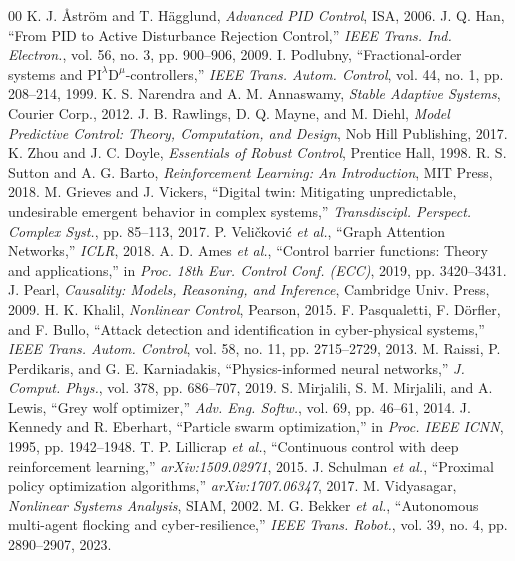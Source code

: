 \documentclass[journal,twocolumn]{IEEEtran}
\begin{document}
\begin{thebibliography}{00}
 K. J. \AA str\"om and T. H\"agglund, \textit{Advanced PID Control}, ISA, 2006.
 J. Q. Han, ``From PID to Active Disturbance Rejection Control,'' \textit{IEEE Trans. Ind. Electron.}, vol. 56, no. 3, pp. 900--906, 2009.
 I. Podlubny, ``Fractional-order systems and $\text{PI}^\lambda \text{D}^\mu$-controllers,'' \textit{IEEE Trans. Autom. Control}, vol. 44, no. 1, pp. 208--214, 1999.
 K. S. Narendra and A. M. Annaswamy, \textit{Stable Adaptive Systems}, Courier Corp., 2012.
 J. B. Rawlings, D. Q. Mayne, and M. Diehl, \textit{Model Predictive Control: Theory, Computation, and Design}, Nob Hill Publishing, 2017.
 K. Zhou and J. C. Doyle, \textit{Essentials of Robust Control}, Prentice Hall, 1998.
 R. S. Sutton and A. G. Barto, \textit{Reinforcement Learning: An Introduction}, MIT Press, 2018.
 M. Grieves and J. Vickers, ``Digital twin: Mitigating unpredictable, undesirable emergent behavior in complex systems,'' \textit{Transdiscipl. Perspect. Complex Syst.}, pp. 85--113, 2017.
 P. Veli\v{c}kovi\'c \textit{et al.}, ``Graph Attention Networks,'' \textit{ICLR}, 2018.
 A. D. Ames \textit{et al.}, ``Control barrier functions: Theory and applications,'' in \textit{Proc. 18th Eur. Control Conf. (ECC)}, 2019, pp. 3420--3431.
 J. Pearl, \textit{Causality: Models, Reasoning, and Inference}, Cambridge Univ. Press, 2009.
 H. K. Khalil, \textit{Nonlinear Control}, Pearson, 2015.
 F. Pasqualetti, F. D\"orfler, and F. Bullo, ``Attack detection and identification in cyber-physical systems,'' \textit{IEEE Trans. Autom. Control}, vol. 58, no. 11, pp. 2715--2729, 2013.
 M. Raissi, P. Perdikaris, and G. E. Karniadakis, ``Physics-informed neural networks,'' \textit{J. Comput. Phys.}, vol. 378, pp. 686--707, 2019.
 S. Mirjalili, S. M. Mirjalili, and A. Lewis, ``Grey wolf optimizer,'' \textit{Adv. Eng. Softw.}, vol. 69, pp. 46--61, 2014.
 J. Kennedy and R. Eberhart, ``Particle swarm optimization,'' in \textit{Proc. IEEE ICNN}, 1995, pp. 1942--1948.
 T. P. Lillicrap \textit{et al.}, ``Continuous control with deep reinforcement learning,'' \textit{arXiv:1509.02971}, 2015.
 J. Schulman \textit{et al.}, ``Proximal policy optimization algorithms,'' \textit{arXiv:1707.06347}, 2017.
 M. Vidyasagar, \textit{Nonlinear Systems Analysis}, SIAM, 2002.
 M. G. Bekker \textit{et al.}, ``Autonomous multi-agent flocking and cyber-resilience,'' \textit{IEEE Trans. Robot.}, vol. 39, no. 4, pp. 2890--2907, 2023.
\end{thebibliography}
\end{document}
